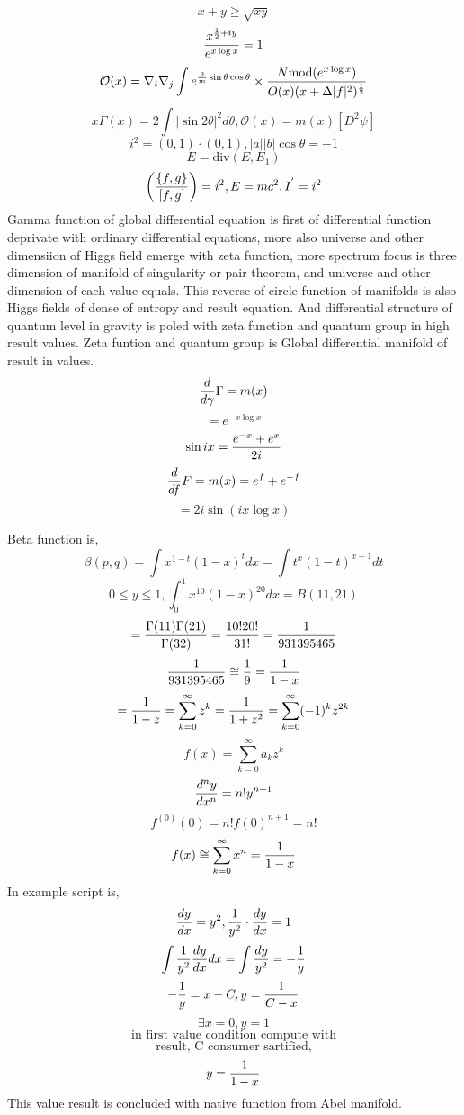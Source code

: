 \documentclass{jsarticle}
\begin{document}
    $$ {x + y} \ge \sqrt{x y} $$
    $$ {x^{{1 \over 2} + iy} \over e^{x \log x}} = 1 $$
    $$ \mathcal{O}(x) = \nabla_i \nabla_j \int e^{{2 \over m}\sin \theta 
    \cos \theta } \times {{N \mathrm{mod}(e^{x \log x})} \over {O(x)(x +
    \Delta |f|^2)^{1 \over 2}}} $$
    $$ x \Gamma(x) = 2 \int|\sin 2 \theta|^2 d \theta, \mathcal{O}(x)
    = m(x)[D^2 \psi] $$
    $$ i^2 = (0,1) \cdot (0,1), |a||b|\cos \theta = - 1 $$
    $$ E = \mathrm{div}(E, E_1) $$
    $$ \left({\{f,g\}} \over [f,g] \right) = i^2, E = mc^2, I^{'} = i^2 $$
     Gamma function of global differential equation is first of differential
    function deprivate with ordinary differential equations, more also
    universe and other dimensiion of Higgs field emerge with zeta function,
    more spectrum focus is three dimension of manifold of singularity or pair
    theorem, and universe and other dimension of each value equals.
    This reverse of circle function of manifolds is also Higgs fields of 
    dense of entropy and result equation. And differential structure of quantum
    level in gravity is poled with zeta function and quantum group in high 
    result values. Zeta funtion and quantum group is Global differential
    manifold of result in values.
    $$ {d \over d \gamma} \Gamma = m(x) $$
    $$ = e^{- x \log x} $$
    $$ \sin i x = {{e^{-x} + e^{x}} \over 2i} $$
    $$ {d \over df}F = m(x) = e^{f} + e^{-f} $$
    $$ = 2 i \sin (i {x \log x}) $$


   Beta function is,
      $$ \beta(p,q) = \int x^{1 - t} (1 - x)^{t}dx = \int t^{x}(1 - t)^{x - 1}
      dt $$
      $$ 0 \le y \le 1, \int^{1}_{0} x^{10}(1 - x)^{20}dx = B(11,21) $$
      $$ = {{\Gamma(11)\Gamma(21)} \over \Gamma(32)} = {{10! 20!} \over {
	      31!}} = {1 \over {931395465}} $$
       $$ {1 \over {931395465}} \cong {1 \over 9} = {1 \over {1 - x}} $$
	 $$     = {1 \over {1 - z}} =
	      \sum_{k=0}^{\infty}z^k = {1 \over {1 + z^2}} = \sum_{
		      k=0}^{\infty} (-1)^k z^{2k} $$
      $$ f(x) = \sum_{k=0}^{\infty} a_k z^k $$
      $$ {{d^n y} \over dx^n} = n! y^{n+1} $$
      $$ f^{(0)}(0) = n!f(0)^{n+1} = n! $$
      $$ f(x) \cong \sum_{k=0}^{\infty}x^n = {1 \over {1 - x}} $$
      In example script is,
      $$ {{dy} \over dx} = y^2, {1 \over y^2}\cdot {dy \over dx} = 1 $$
      $$ \int {1 \over y^2}{dy \over dx}dx = \int{dy \over y^2} = - {1 \over y
      } $$
      $$ - {1 \over y} = x - C, y = {1 \over {C - x}} $$
      $$ \exists x = 0, y = 1 $$
      $$\text{in first value condition compute with} $$
      $$ \text{result, C consumer sartified,} $$
      $$ y = {1 \over {1 - x}} $$
      This value result is concluded with native function from Abel manifold.
\end{document}
